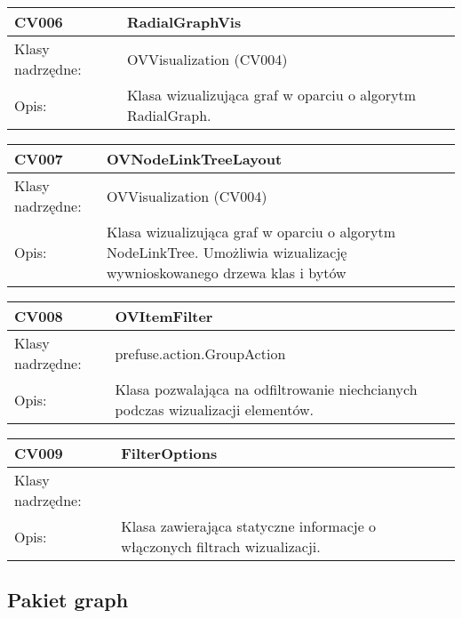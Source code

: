 \begin{longtable}{|m{3.5cm}|m{8.5cm}|} \hline

CV006 & RadialGraphVis \\ \hline
Klasy nadrzędne: & OVVisualization (CV004) \\ \hline
Opis: &  Klasa wizualizująca graf w oparciu o algorytm RadialGraph. \\ \hline

\end{longtable}

\begin{longtable}{|m{3.5cm}|m{8.5cm}|} \hline

CV007 & OVNodeLinkTreeLayout \\ \hline
Klasy nadrzędne: & OVVisualization (CV004) \\ \hline
Opis: &  Klasa wizualizująca graf w oparciu o algorytm NodeLinkTree. Umożliwia wizualizację wywnioskowanego drzewa klas i bytów \\ \hline

\end{longtable}

\begin{longtable}{|m{3.5cm}|m{8.5cm}|} \hline

CV008 & OVItemFilter \\ \hline
Klasy nadrzędne: & prefuse.action.GroupAction \\ \hline
Opis: &  Klasa pozwalająca na odfiltrowanie niechcianych podczas wizualizacji elementów. \\ \hline

\end{longtable}

\begin{longtable}{|m{3.5cm}|m{8.5cm}|} \hline

CV009 & FilterOptions \\ \hline
Klasy nadrzędne: &   \\ \hline
Opis: &  Klasa zawierająca statyczne informacje o włączonych filtrach wizualizacji. \\ \hline


\end{longtable}


\subsection*{Pakiet graph}

